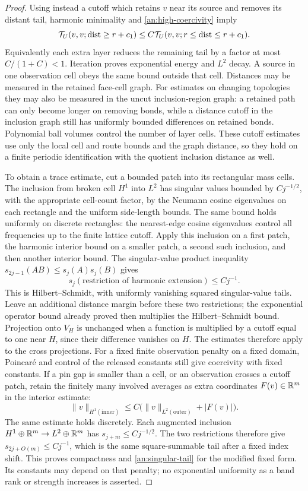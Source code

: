 \begin{proof}
Using instead a cutoff which retains $v$ near its
source and removes its distant tail, harmonic
minimality and \eqref{an:high-coercivity} imply
\[
 \mathcal T_U(v,v;\operatorname{dist}\ge r+c_1)
     \le C\mathcal T_U(v,v;r\le\operatorname{dist}\le r+c_1).
\]
Equivalently each extra layer reduces the remaining
tail by a factor at most $C/(1+C)<1$.  Iteration
proves exponential energy and $L^2$ decay.  A
source in one observation cell obeys the same
bound outside that cell.  Distances may be
measured in the retained face-cell graph.  For
estimates on changing topologies they may also
be measured in the uncut inclusion-region graph:
a retained path can only become longer on
removing bonds, while a distance cutoff in the
inclusion graph still has uniformly bounded
differences on retained bonds.  Polynomial ball
volumes control the number of layer cells.
These cutoff estimates use only the local cell and route bounds
and the graph distance, so they hold on a finite periodic
identification with the quotient inclusion distance as well.

To obtain a trace estimate, cut a bounded patch
into its rectangular mass cells.  The inclusion from broken
cell $H^1$ into $L^2$ has singular values bounded
by $Cj^{-1/2}$, with the appropriate cell-count
factor, by the Neumann cosine eigenvalues on
each rectangle and the uniform side-length bounds.  The same bound
holds uniformly on discrete rectangles: the nearest-edge cosine
eigenvalues control all frequencies up to the
finite lattice cutoff.  Apply this inclusion
on a first patch, the harmonic interior bound
on a smaller patch, a second such inclusion,
and then another interior bound.  The
singular-value product inequality
$s_{2j-1}(AB)\le s_j(A)s_j(B)$ gives
\begin{equation}
 s_j(\text{restriction of harmonic extension})
          \le Cj^{-1}.
 \label{an:singular-tail}
\end{equation}
This is Hilbert--Schmidt, with uniformly vanishing
squared singular-value tails.  Leave an additional
distance margin before these two restrictions;
the exponential operator bound already proved
then multiplies the Hilbert--Schmidt bound.
Projection onto $V_H$ is unchanged when a
function is multiplied by a cutoff equal to
one near $H$, since their difference vanishes
on $H$.  The estimates therefore apply to the
cross projections.  For a fixed finite observation penalty on a
fixed domain, Poincar\'e and control of the released constants
still give coercivity with fixed constants.  If a pin gap is
smaller than a cell, or an observation crosses a cutoff patch,
retain the finitely many involved averages as extra coordinates
$F(v)\in\mathbb R^m$ in the interior estimate:
\[
 \|v\|_{H^1(\text{inner})}
 \le C\bigl(\|v\|_{L^2(\text{outer})}+|F(v)|\bigr).
\]
The same estimate holds discretely.  Each augmented inclusion
$H^1\oplus\mathbb R^m\to L^2\oplus\mathbb R^m$ has
$s_{j+m}\le Cj^{-1/2}$.  The two restrictions therefore give
$s_{2j+O(m)}\le Cj^{-1}$, which is the same square-summable
tail after a fixed index shift.  This proves compactness and
\eqref{an:singular-tail} for the modified fixed form.  Its constants
may depend on that penalty; no exponential uniformity as a band
rank or strength increases is asserted.


\end{proof}
